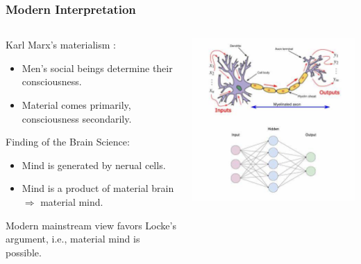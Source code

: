 \documentclass{beamer}
\begin{document}
\begin{frame}
    \frametitle{Modern Interpretation}
    \begin{columns}
        \begin{column}{.6\textwidth}
            Karl Marx's materialism \cite{marx-1932}:
            \begin{itemize}
                \item Men's social beings determine their consciousness.
                \item Material comes primarily, consciousness secondarily.
            \end{itemize}
            Finding of the Brain Science:
            \begin{itemize}
                \item Mind is generated by nerual cells.
                \item Mind is a product of material brain \\ $\Rightarrow$ material mind.
            \end{itemize}
            Modern mainstream view favors Locke's argument, i.e., material mind is possible.
        \end{column}
        \begin{column}{.4\textwidth}
            \centering
            \includegraphics[width=1\textwidth]{img/nerual.jpeg}
        \end{column}
    \end{columns}
\end{frame}
\end{document}
